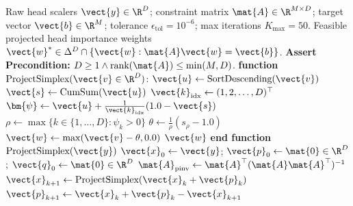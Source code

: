 \begin{algorithm}[H]
\caption[WGQA Simplex Projection via Euclidean Sorting and Dykstra Alternating Proje]{WGQA Simplex Projection via Euclidean Sorting and Dykstra Alternating Projections}
\label{alg:wgqa_simplex_projection}
\begin{algorithmic}[1]
\REQUIRE Raw head scalers $\vect{y} \in \R^D$; constraint matrix $\mat{A} \in \R^{M \times D}$; target vector $\vect{b} \in \R^M$; tolerance $\epsilon_{\text{tol}} = 10^{-6}$; max iterations $K_{\max} = 50$.
\ENSURE Feasible projected head importance weights $\vect{w}^* \in \Delta^D \cap \{\vect{w} : \mat{A}\vect{w} = \vect{b}\}$.
\STATE \textbf{Assert Precondition:} $D \ge 1 \land \text{rank}(\mat{A}) \le \min(M, D)$.
\STATE \textbf{function} $\text{ProjectSimplex}(\vect{v} \in \R^D)$:
    \STATE \quad $\vect{u} \leftarrow \text{SortDescending}(\vect{v})$ 
    \STATE \quad $\vect{s} \leftarrow \text{CumSum}(\vect{u})$ 
    \STATE \quad $\vect{k}_{\text{idx}} \leftarrow (1, 2, \dots, D)^\top$
    \STATE \quad $\bm{\psi} \leftarrow \vect{u} + \frac{1}{\vect{k}_{\text{idx}}} (1.0 - \vect{s})$
    \STATE \quad $\rho \leftarrow \max\{k \in \{1, \dots, D\} : \psi_k > 0\}$ 
    \STATE \quad $\theta \leftarrow \frac{1}{\rho}(s_\rho - 1.0)$ 
    \STATE \quad $\vect{w} \leftarrow \max(\vect{v} - \theta, 0.0)$ 
    \STATE \quad \RETURN $\vect{w}$
\STATE \textbf{end function}
    \RETURN $\text{ProjectSimplex}(\vect{y})$ 
\ENDIF
\STATE {}
\STATE $\vect{x}_0 \leftarrow \vect{y}$; $\vect{p}_0 \leftarrow \mat{0} \in \R^D$; $\vect{q}_0 \leftarrow \mat{0} \in \R^D$
\STATE $\mat{A}_{\text{pinv}} \leftarrow \mat{A}^\top (\mat{A} \mat{A}^\top)^{-1}$ 
    \STATE {}
    \STATE $\vect{x}_{k+1} \leftarrow \text{ProjectSimplex}(\vect{x}_k + \vect{p}_k)$
    \STATE $\vect{p}_{k+1} \leftarrow \vect{x}_k + \vect{p}_k - \vect{x}_{k+1}$ 
    \STATE {}

\end{algorithmic}
\end{algorithm}
